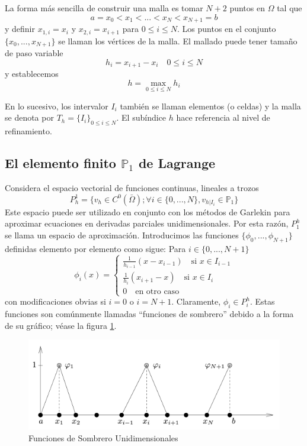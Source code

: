 La forma más sencilla de construir una malla es tomar $N + 2$ puntos en $\Omega$ tal que
\begin{equation}
    \label{eq: TAMU 1.2}
    a = x_0 < x_1 <...<x_N < x_{N + 1} = b
\end{equation}
y definir $x_{1, i} = x_i$ y $x_{2,i} = x_{i + 1}$ para $0 \leq i \leq N$. Los puntos en el conjunto $\{ x_0, ..., x_{N + 1} \}$ se llaman los vértices de la malla. El mallado puede tener tamaño de paso variable 
\[ h_i = x_{i + 1} - x_i \quad 0 \leq i \leq N \]
y establecemos
\[ h = \max_{0 \leq i \leq N} h_i \]

En lo sucesivo, los intervalor $I_i$ también se llaman elementos (o celdas) y la malla se denota por $T_h = \{ I_i \}_{0 \leq i \leq N}$. El subíndice $h$ hace referencia al nivel de refinamiento.

\subsection{El elemento finito $\mathbb{P}_1$ de Lagrange}
Considera el espacio vectorial de funciones continuas, lineales a trozos 
\begin{equation}
    \label{eq: TAMU 1.3}
    P_h^1 = \{ v_h \in C^0(\bar{\Omega}); \forall i \in \{ 0,...,N \}, v_{h|I_i} \in \mathbb{P}_1 \}
\end{equation}
Este espacio puede ser utilizado en conjunto con los métodos de Garlekin para aproximar ecuaciones en derivadas parciales unidimensionales. Por esta razón, $P_1^h$ se llama un espacio de aproximación. Introducimos las funciones $\{ \phi_0,..., \phi_{N + 1} \}$ definidas elemento por elemento como sigue: Para $i \in \{ 0,..., N + 1 \}$
\begin{equation}
    \label{eq: TAMU 1.4}
    \phi_i(x) = \begin{cases}
        \frac{1}{h_{i - 1}}(x - x_{i-1}) \quad \text{si } x \in I_{i - 1} \\
        \frac{1}{h_i}(x_{i + 1} - x) \quad \text{si } x \in I_i \\
        0 \quad \text{en otro caso}
    \end{cases}
\end{equation}
con modificaciones obvias si $i = 0$ o $i = N + 1$. Claramente, $\phi_i \in P_i^h$. Estas funciones son comúnmente llamadas ``funciones de sombrero'' debido a la forma de su gráfico; véase la figura \ref{fig: Funciones de Sombrero Unidimensionales}.

\begin{figure}[h]
    \centering
    \includegraphics[width = 0.5 \textwidth]{Imagenes/4 - Funciones de Sombrero Unidimensionales.png}
    \caption{Funciones de Sombrero Unidimensionales}
    \label{fig: Funciones de Sombrero Unidimensionales}
\end{figure}

